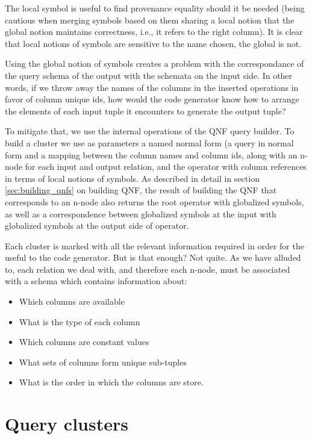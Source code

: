 The local symbol is useful to find provenance equality
should it be needed (being cautious when merging symbols based
on them sharing a local notion that the global notion maintains
correctness, i.e., it refers to the right column). It is clear that
local notions of symbols are sensitive to the name chosen, the
global is not.

Using the global notion of symbols creates a problem with the
correspondance of the query schema of the output with the schemata on
the input side. In other words, if we throw away the names of the
columns in the inserted operations in favor of column unique ids, how would the
code generator know how to arrange the elements of each input tuple
it encounters to generate the output tuple?

To mitigate that, we use the internal operations of the QNF query builder.
To build a cluster we use as parameters a named normal form (a query in normal form and a
mapping between the column names and column ids, along with an n-node for each input
and output relation, and the operator with column references in terms
of local notions of symbols. As described in detail in section \ref{sec:building_qnfs} on building QNF,
the result of building the QNF that corresponds to an n-node also
returns the root operator with globalized symbols, as well as a correspondence
between globalized symbols at the input with globalized symbols at the
output side of operator.

Each cluster is marked with all the relevant information
required in order for the useful to the code generator. But is that
enough? Not quite. As we have alluded to, each relation we deal
with, and therefore each n-node, must be associated with a schema
which contains information about:

\begin{itemize}
\item Which columns are available
\item What is the type of each column
\item Which columns are constant values
\item What sets of columns form unique sub-tuples
\item What is the order in which the columns are store.
\end{itemize}

\section{Query clusters}

